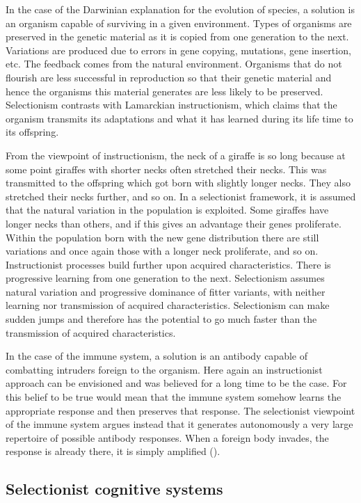 In the case of the Darwinian explanation for the 
evolution of species, a solution is an organism 
capable of surviving in a given environment. Types 
of organisms are preserved in the genetic material as 
it is copied from one generation to the next. 
Variations are produced due to errors in gene copying, 
mutations, gene insertion, etc. The feedback comes
from the natural environment. Organisms that do not flourish are
less successful in reproduction so that their
genetic material and hence the organisms 
this material generates are less likely to be preserved. 
Selectionism contrasts with Lamarckian instructionism, which 
claims that the organism transmits its adaptations 
and what it has learned during its life time to 
its offspring. 

From the viewpoint of instructionism, the
neck of a giraffe is so long because at some point
giraffes with shorter necks often stretched
their necks. This was transmitted
to the offspring which got born with slightly longer necks.
They also stretched their necks further, 
and so on. In a selectionist framework, it is assumed
that the natural variation in the population 
is exploited. Some giraffes have longer necks than 
others, and if this gives an advantage 
their genes proliferate. Within the population born with the 
new gene distribution there are still variations and 
once again those with a longer neck proliferate, and so on. 
Instructionist processes build further upon acquired characteristics. 
There is progressive learning from one 
generation to the next. Selectionism assumes natural 
variation and progressive dominance of fitter variants, with 
neither learning nor transmission of acquired characteristics. 
Selectionism can make sudden jumps and therefore has the 
potential to go much faster than the transmission of acquired
characteristics. 

In the case of the immune system, a solution is an 
antibody capable of combatting intruders foreign to the 
organism. Here again an instructionist approach can 
be envisioned and was believed for a long time to be 
the case. For this belief to be true would mean that
the immune system somehow learns the appropriate response
and then preserves that response. The selectionist viewpoint
of the immune system argues instead that it
generates autonomously 
a very large repertoire of possible antibody responses. 
When a foreign body invades, the response 
is already 
there, it is simply amplified (\citealt{Varela:1988}). 

\subsection{Selectionist cognitive systems}


